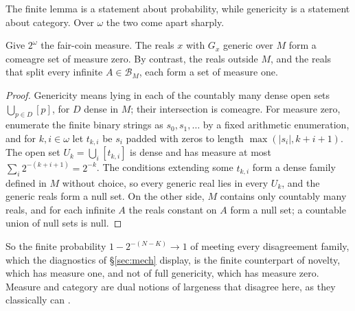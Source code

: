 The finite lemma is a statement about probability, while genericity is a statement about
category. Over $\omega$ the two come apart sharply.

\begin{proposition}\label{prop:category}
Give $2^\omega$ the fair-coin measure. The reals $x$ with $G_x$ generic over $M$ form a comeagre set
of measure zero. By contrast, the reals outside $M$, and the reals that split every infinite
$A\in\mathcal B_M$, each form a set of measure one.
\end{proposition}

\begin{proof}
Genericity means lying in each of the countably many dense open sets $\bigcup_{p\in D}[p]$, for $D$
dense in $M$; their intersection is comeagre. For measure zero, enumerate the finite binary strings
as $s_0,s_1,\dots$ by a fixed arithmetic enumeration, and for $k,i\in\omega$ let $t_{k,i}$ be $s_i$
padded with zeros to length $\max(|s_i|,k+i+1)$. The open set $U_k=\bigcup_i[t_{k,i}]$ is dense and
has measure at most $\sum_i2^{-(k+i+1)}=2^{-k}$. The conditions extending some $t_{k,i}$ form a
dense family defined in $M$ without choice, so every generic real lies in every $U_k$, and the
generic reals form a null set. On the other side, $M$ contains only countably many reals, and for
each infinite $A$ the reals constant on $A$ form a null set; a countable union of null sets is
null.
\end{proof}

So the finite probability $1-2^{-(N-K)}\to1$ of meeting every disagreement family, which the
diagnostics of \S\ref{sec:mech} display, is the finite counterpart of novelty, which has measure
one, and not of full genericity, which has measure zero. Measure and category are dual notions of
largeness that disagree here, as they classically can \citep{Oxtoby1980}.

